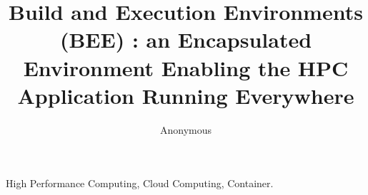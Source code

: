 \documentclass[10, conference, compsocconf ]{IEEEtran}
\begin{document}
\title{Build and Execution Environments (BEE) :
an Encapsulated Environment Enabling
the HPC Application Running Everywhere }



\author{Anonymous } 



\maketitle


\begin{abstract}

\end{abstract}

\begin{IEEEkeywords}
   High Performance Computing, Cloud Computing, Container.\\
\end{IEEEkeywords}
\end{document}
